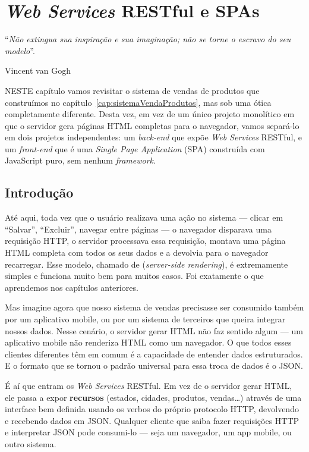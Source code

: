 \chapter{\textit{Web Services} RESTful e SPAs}\label{cap:webservicesRestful}
\epigraph{``\textit{Não extingua sua inspiração e sua imaginação; não se torne o escravo do seu modelo}''.}{Vincent van Gogh}

\lettrine[lines=4, lhang=0.1, lraise=0, loversize=0.2, findent=0.1em]{\textcolor{corTema}{N}}{ESTE} capítulo vamos revisitar o sistema de vendas de produtos que construímos no capítulo~\ref{cap:sistemaVendaProdutos}, mas sob uma ótica completamente diferente. Desta vez, em vez de um único projeto monolítico em que o servidor gera páginas HTML completas para o navegador, vamos separá-lo em dois projetos independentes: um \textit{back-end} que expõe \textit{Web Services} RESTful, e um \textit{front-end} que é uma \textit{Single Page Application} (SPA) construída com JavaScript puro, sem nenhum \textit{framework}.

\vfill

\section{Introdução}

Até aqui, toda vez que o usuário realizava uma ação no sistema --- clicar em ``Salvar'', ``Excluir'', navegar entre páginas --- o navegador disparava uma requisição HTTP, o servidor processava essa requisição, montava uma página HTML completa com todos os seus dados e a devolvia para o navegador recarregar. Esse modelo, chamado de  (\textit{server-side rendering}), é extremamente simples e funciona muito bem para muitos casos. Foi exatamente o que aprendemos nos capítulos anteriores.

Mas imagine agora que nosso sistema de vendas precisasse ser consumido também por um aplicativo mobile, ou por um sistema de terceiros que queira integrar nossos dados. Nesse cenário, o servidor gerar HTML não faz sentido algum --- um aplicativo mobile não renderiza HTML como um navegador. O que todos esses clientes diferentes têm em comum é a capacidade de entender dados estruturados. E o formato que se tornou o padrão universal para essa troca de dados é o JSON.

É aí que entram os \textit{Web Services} RESTful. Em vez de o servidor gerar HTML, ele passa a expor \textbf{recursos} (estados, cidades, produtos, vendas\ldots) através de uma interface bem definida usando os verbos do próprio protocolo HTTP, devolvendo e recebendo dados em JSON. Qualquer cliente que saiba fazer requisições HTTP e interpretar JSON pode consumi-lo --- seja um navegador, um app mobile, ou outro sistema.

